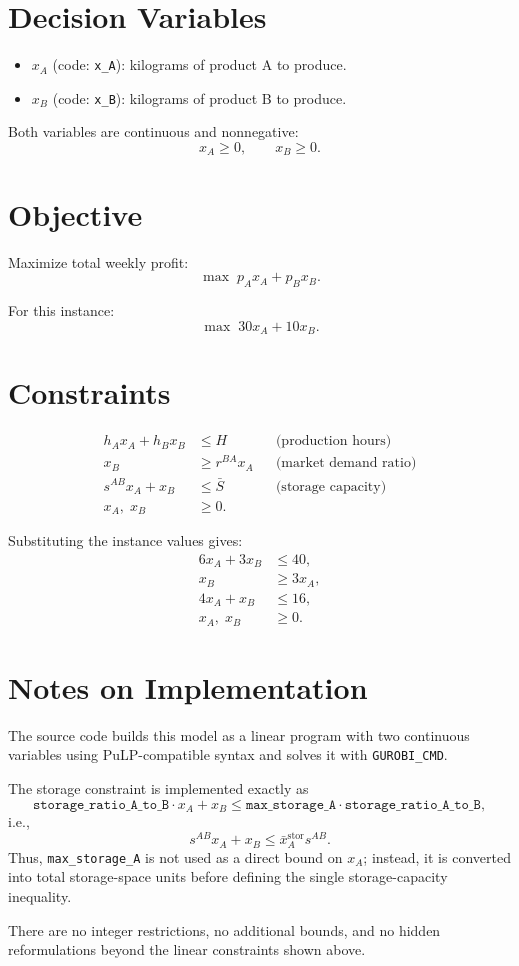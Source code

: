 \section*{Decision Variables}

\begin{itemize}
    \item $x_A$ (code: \texttt{x\_A}): kilograms of product A to produce.
    \item $x_B$ (code: \texttt{x\_B}): kilograms of product B to produce.
\end{itemize}

Both variables are continuous and nonnegative:
\[
x_A \ge 0,\qquad x_B \ge 0.
\]

\section*{Objective}

Maximize total weekly profit:
\[
\max \; p_A x_A + p_B x_B.
\]

For this instance:
\[
\max \; 30x_A + 10x_B.
\]

\section*{Constraints}

\begin{align}
h_A x_A + h_B x_B &\le H
&& \text{(production hours)} \\
x_B &\ge r^{BA} x_A
&& \text{(market demand ratio)} \\
s^{AB} x_A + x_B &\le \bar{S}
&& \text{(storage capacity)} \\
x_A,\; x_B &\ge 0.
\end{align}

Substituting the instance values gives:
\begin{align}
6x_A + 3x_B &\le 40, \\
x_B &\ge 3x_A, \\
4x_A + x_B &\le 16, \\
x_A,\; x_B &\ge 0.
\end{align}

\section*{Notes on Implementation}

The source code builds this model as a linear program with two continuous variables using PuLP-compatible syntax and solves it with \texttt{GUROBI\_CMD}.

The storage constraint is implemented exactly as
\[
\texttt{storage\_ratio\_A\_to\_B} \cdot x_A + x_B \le \texttt{max\_storage\_A} \cdot \texttt{storage\_ratio\_A\_to\_B},
\]
i.e.,
\[
s^{AB} x_A + x_B \le \bar{x}_A^{\text{stor}} s^{AB}.
\]
Thus, \texttt{max\_storage\_A} is not used as a direct bound on $x_A$; instead, it is converted into total storage-space units before defining the single storage-capacity inequality.

There are no integer restrictions, no additional bounds, and no hidden reformulations beyond the linear constraints shown above.
